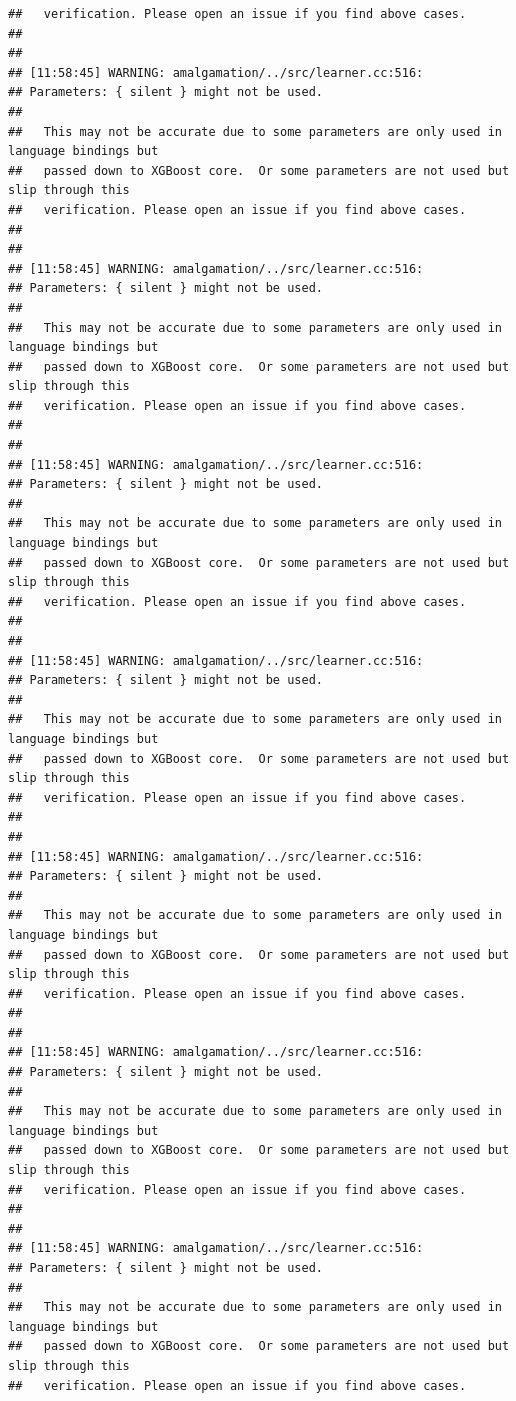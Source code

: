 \documentclass[AMS,STIX2COL]{WileyNJD-v2}\usepackage[]{graphicx}\usepackage[]{color}
\makeatletter
\newenvironment{kframe}{%
 \def\at@end@of@kframe{}%
 \ifinner\ifhmode%
  \def\at@end@of@kframe{\end{minipage}}%
  \begin{minipage}{\columnwidth}%
 \fi\fi%
 \def\FrameCommand##1{\hskip\@totalleftmargin \hskip-\fboxsep
 \colorbox{shadecolor}{##1}\hskip-\fboxsep
     \hskip-\linewidth \hskip-\@totalleftmargin \hskip\columnwidth}%
 \MakeFramed {\advance\hsize-\width
   \@totalleftmargin\z@ \linewidth\hsize
   \@setminipage}}%
 {\par\unskip\endMakeFramed%
 \at@end@of@kframe}
\newenvironment{knitrout}{}{} %
\makeatother
\begin{document}
\begin{knitrout}
\begin{kframe}
\begin{verbatim}
##   verification. Please open an issue if you find above cases.
## 
## 
## [11:58:45] WARNING: amalgamation/../src/learner.cc:516: 
## Parameters: { silent } might not be used.
## 
##   This may not be accurate due to some parameters are only used in language bindings but
##   passed down to XGBoost core.  Or some parameters are not used but slip through this
##   verification. Please open an issue if you find above cases.
## 
## 
## [11:58:45] WARNING: amalgamation/../src/learner.cc:516: 
## Parameters: { silent } might not be used.
## 
##   This may not be accurate due to some parameters are only used in language bindings but
##   passed down to XGBoost core.  Or some parameters are not used but slip through this
##   verification. Please open an issue if you find above cases.
## 
## 
## [11:58:45] WARNING: amalgamation/../src/learner.cc:516: 
## Parameters: { silent } might not be used.
## 
##   This may not be accurate due to some parameters are only used in language bindings but
##   passed down to XGBoost core.  Or some parameters are not used but slip through this
##   verification. Please open an issue if you find above cases.
## 
## 
## [11:58:45] WARNING: amalgamation/../src/learner.cc:516: 
## Parameters: { silent } might not be used.
## 
##   This may not be accurate due to some parameters are only used in language bindings but
##   passed down to XGBoost core.  Or some parameters are not used but slip through this
##   verification. Please open an issue if you find above cases.
## 
## 
## [11:58:45] WARNING: amalgamation/../src/learner.cc:516: 
## Parameters: { silent } might not be used.
## 
##   This may not be accurate due to some parameters are only used in language bindings but
##   passed down to XGBoost core.  Or some parameters are not used but slip through this
##   verification. Please open an issue if you find above cases.
## 
## 
## [11:58:45] WARNING: amalgamation/../src/learner.cc:516: 
## Parameters: { silent } might not be used.
## 
##   This may not be accurate due to some parameters are only used in language bindings but
##   passed down to XGBoost core.  Or some parameters are not used but slip through this
##   verification. Please open an issue if you find above cases.
## 
## 
## [11:58:45] WARNING: amalgamation/../src/learner.cc:516: 
## Parameters: { silent } might not be used.
## 
##   This may not be accurate due to some parameters are only used in language bindings but
##   passed down to XGBoost core.  Or some parameters are not used but slip through this
##   verification. Please open an issue if you find above cases.

\end{verbatim}
\end{kframe}
\end{knitrout}
\end{document}
